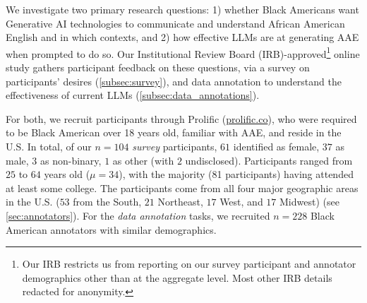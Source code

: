 



We investigate two primary research questions: 1) whether Black Americans want Generative AI technologies to communicate and understand African American English and in which contexts, and 2) how effective LLMs are at generating AAE when prompted to do so. Our Institutional Review Board (IRB)-approved\footnote{Our IRB restricts us from reporting on our survey participant and annotator demographics other than at the aggregate level. Most other IRB details redacted for anonymity.} online study gathers participant feedback on these questions, via a survey on participants' desires (\autoref{subsec:survey}), and data annotation to understand the effectiveness of current LLMs (\autoref{subsec:data_annotations}). 

For both, we recruit participants through Prolific (\url{prolific.co}), who were required to be Black American over 18 years old, familiar with AAE, and reside in the U.S. 
In total, of our $n=104$ \textit{survey} participants, $61$ identified as female, $37$ as male, $3$ as non-binary, $1$ as other (with $2$ undisclosed). Participants ranged from $25$ to $64$ years old ($\mu=34$), with the majority (81 participants) 
having attended at least some college.
The participants come from all four major geographic areas in the U.S. ($53$ from the South, $21$ Northeast, $17$ West, and $17$ Midwest) (see \autoref{sec:annotators}). For the \textit{data annotation} tasks, we recruited %
$n=228$ 
Black American annotators with similar demographics.
